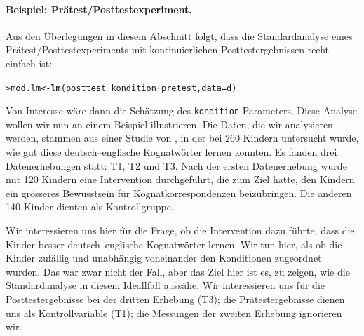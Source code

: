 \documentclass[oneside, 10pt]{book}\usepackage[]{graphicx}\usepackage[]{xcolor}
\makeatletter
\newcommand{\hlopt}[1]{\textcolor[rgb]{0,0,0}{#1}}%
\newcommand{\hlstd}[1]{\textcolor[rgb]{0.345,0.345,0.345}{#1}}%
\newcommand{\hlkwb}[1]{\textcolor[rgb]{0.69,0.353,0.396}{#1}}%
\newcommand{\hlkwc}[1]{\textcolor[rgb]{0.333,0.667,0.333}{#1}}%
\newcommand{\hlkwd}[1]{\textcolor[rgb]{0.737,0.353,0.396}{\textbf{#1}}}%
\newenvironment{kframe}{%
 \def\at@end@of@kframe{}%
 \ifinner\ifhmode%
  \def\at@end@of@kframe{\end{minipage}}%
  \begin{minipage}{\columnwidth}%
 \fi\fi%
 \def\FrameCommand##1{\hskip\@totalleftmargin \hskip-\fboxsep
 \colorbox{shadecolor}{##1}\hskip-\fboxsep
     \hskip-\linewidth \hskip-\@totalleftmargin \hskip\columnwidth}%
 \MakeFramed {\advance\hsize-\width
   \@totalleftmargin\z@ \linewidth\hsize
   \@setminipage}}%
 {\par\unskip\endMakeFramed%
 \at@end@of@kframe}
\newenvironment{knitrout}{}{} %
\makeatother
\begin{document}
\paragraph{Beispiel: Prätest/Posttestexperiment.}
Aus den Überlegungen in diesem Abschnitt folgt, dass
die Standardanalyse eines Prätest/Posttestexperiments mit
kontinuierlichen Posttestergebnissen recht einfach ist:
\begin{knitrout}
\color{fgcolor}\begin{kframe}
\begin{alltt}
\hlstd{> }\hlstd{mod.lm} \hlkwb{<-} \hlkwd{lm}\hlstd{(posttest} \hlopt{~} \hlstd{kondition} \hlopt{+} \hlstd{pretest,} \hlkwc{data} \hlstd{= d)}
\end{alltt}
\end{kframe}
\end{knitrout}
Von Interesse wäre dann die Schätzung des \texttt{kondition}-Parameters.
Diese Analyse wollen wir nun an einem Beispiel illustrieren.
Die Daten, die wir analysieren werden, stammen
  aus einer Studie von \citet{Hicks2021}, in der bei 260 Kindern
  untersucht wurde, wie gut diese deutsch--englische Kognatwörter
  lernen konnten. Es fanden drei Datenerhebungen statt: T1, T2 und T3.
  Nach der ersten Datenerhebung wurde mit 120 Kindern eine Intervention
  durchgeführt, die zum Ziel hatte, den Kindern ein grösseres Bewusstsein
  für Kognatkorrespondenzen beizubringen. Die anderen 140 Kinder dienten
  als Kontrollgruppe.

  Wir interessieren uns hier für die Frage, ob die Intervention dazu führte,
  dass die Kinder besser deutsch--englische Kognatwörter lernen.
  Wir tun hier, als ob die Kinder zufällig und unabhängig voneinander
  den Konditionen zugeordnet wurden. 
  Das war zwar nicht der Fall,
  aber das Ziel hier ist es, zu zeigen, wie die Standardanalyse in
  diesem Ideallfall aussähe.
  Wir interessieren uns für die Posttestergebnisse bei der dritten Erhebung (T3);
  die Prätestergebnisse dienen uns als Kontrollvariable (T1);
  die Messungen der zweiten Erhebung ignorieren wir.
\end{document}
